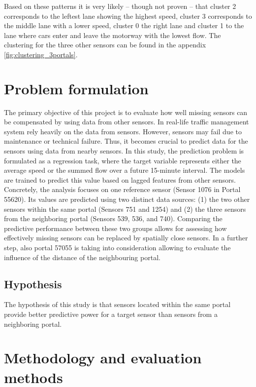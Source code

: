 	\noindent Based on these patterns it is very likely -- though not proven -- that cluster 2 corresponds to the leftest lane showing the highest speed, cluster 3 corresponds to the middle lane with a lower speed, cluster 0 the right lane and cluster 1 to the lane where cars enter and leave the motorway with the lowest flow. \newline 
	The clustering for the three other sensors can be found in the appendix \ref{fig:clustering_3portals}.

	\section{Problem formulation}
	The primary objective of this project is to evaluate how well missing sensors can be compensated by using data from other sensors. \newline 
	In real-life traffic management system rely heavily on the data from sensors. However, sensors may fail due to maintenance or technical failure. Thus, it becomes crucial to predict data for the sensors using data from nearby sensors. \newline 
	In this study, the prediction problem is formulated as a regression task, where the target variable represents either the average speed or the summed flow over a future 15-minute interval. The models are trained to predict this value based on lagged features from other sensors.\newline 
	Concretely, the analysis focuses on one reference sensor (Sensor 1076 in Portal 55620). Its values are predicted using two distinct data sources: (1) the two other sensors within the same portal (Sensors 751 and 1254) and (2) the three sensors from the neighboring portal (Sensors 539, 536, and 740). Comparing the predictive performance between these two groups allows for assessing how effectively missing sensors can be replaced by spatially close sensors. In a further step, also portal 57055 is taking into consideration allowing to evaluate the influence of the distance of the neighbouring portal.
	\subsection{Hypothesis}
	The hypothesis of this study is that sensors located within the same portal provide better predictive power for a target sensor than sensors from a neighboring portal.
	\section{Methodology and evaluation methods}
